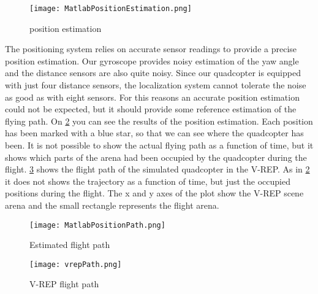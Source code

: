 \begin{figure}[h!]
 \begin{center}
  \texttt{[image: MatlabPositionEstimation.png]}
 \end{center}
  \caption{position estimation\label{fig:matlabPosEstimation}}
\end{figure}

The positioning system relies on accurate sensor readings to provide a precise position estimation. Our gyroscope provides noisy estimation of the yaw angle and the distance sensors are also quite noisy. Since our quadcopter is equipped with just four distance sensors, the localization system cannot tolerate the noise as good as with eight sensors. For this reasons an accurate position estimation could not be expected, but it should provide some reference estimation of the flying path. On \ref{fig:matlabPosPath} you can see the results of the position estimation. Each position has been marked with a blue star, so that we can see where the quadcopter has been. It is not possible to show the actual flying path as a function of time, but it shows which parts of the arena had been occupied by the quadcopter during the flight. \ref{fig:vrepPosPath} shows the flight path of the simulated quadcopter in the V-REP. As in \ref{fig:matlabPosPath} it does not shows the trajectory as a function of time, but just the occupied positions during the flight. The x and y axes of the plot show the V-REP scene arena and the small rectangle represents the flight arena.

\begin{figure}[h!]
 \begin{center}
  \texttt{[image: MatlabPositionPath.png]}
 \end{center}
  \caption{Estimated flight path\label{fig:matlabPosPath}}
\end{figure}

\begin{figure}[h!]
 \begin{center}
  \texttt{[image: vrepPath.png]}
 \end{center}
  \caption{V-REP flight path\label{fig:vrepPosPath}}
\end{figure}

